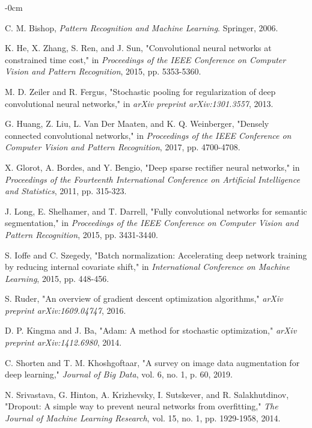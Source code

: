 \documentclass[journal,article,submit,pdftex,moreauthors]{Definitions/mdpi}
\begin{document}
\begin{adjustwidth}{-\extralength}{0cm}
\begin{thebibliography}{999}
C. M. Bishop, \textit{Pattern Recognition and Machine Learning}. Springer, 2006.

K. He, X. Zhang, S. Ren, and J. Sun, "Convolutional neural networks at constrained time cost," in \textit{Proceedings of the IEEE Conference on Computer Vision and Pattern Recognition}, 2015, pp. 5353-5360.

M. D. Zeiler and R. Fergus, "Stochastic pooling for regularization of deep convolutional neural networks," in \textit{arXiv preprint arXiv:1301.3557}, 2013.

G. Huang, Z. Liu, L. Van Der Maaten, and K. Q. Weinberger, "Densely connected convolutional networks," in \textit{Proceedings of the IEEE Conference on Computer Vision and Pattern Recognition}, 2017, pp. 4700-4708.

X. Glorot, A. Bordes, and Y. Bengio, "Deep sparse rectifier neural networks," in \textit{Proceedings of the Fourteenth International Conference on Artificial Intelligence and Statistics}, 2011, pp. 315-323.

J. Long, E. Shelhamer, and T. Darrell, "Fully convolutional networks for semantic segmentation," in \textit{Proceedings of the IEEE Conference on Computer Vision and Pattern Recognition}, 2015, pp. 3431-3440.


S. Ioffe and C. Szegedy, "Batch normalization: Accelerating deep network training by reducing internal covariate shift," in \textit{International Conference on Machine Learning}, 2015, pp. 448-456.

S. Ruder, "An overview of gradient descent optimization algorithms," \textit{arXiv preprint arXiv:1609.04747}, 2016.

D. P. Kingma and J. Ba, "Adam: A method for stochastic optimization," \textit{arXiv preprint arXiv:1412.6980}, 2014.

C. Shorten and T. M. Khoshgoftaar, "A survey on image data augmentation for deep learning," \textit{Journal of Big Data}, vol. 6, no. 1, p. 60, 2019.

N. Srivastava, G. Hinton, A. Krizhevsky, I. Sutskever, and R. Salakhutdinov, "Dropout: A simple way to prevent neural networks from overfitting," \textit{The Journal of Machine Learning Research}, vol. 15, no. 1, pp. 1929-1958, 2014.


\end{thebibliography}
\end{adjustwidth}
\end{document}
